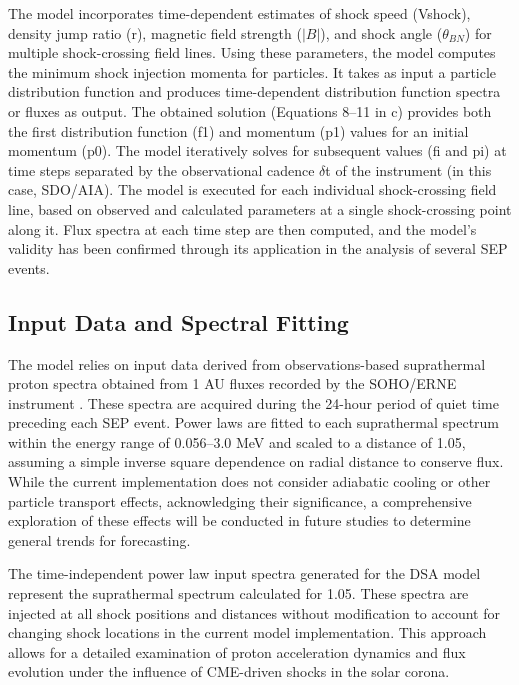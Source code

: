 The model incorporates time-dependent estimates of shock speed (Vshock), density jump ratio (r), magnetic field strength ($|B|$), and shock angle ($\theta_{BN}$) for multiple shock-crossing field lines. Using these parameters, the model computes the minimum shock injection momenta for particles. It takes as input a particle distribution function and produces time-dependent distribution function spectra or fluxes as output. The obtained solution (Equations 8–11 in c\citet{kozarev_2016}) provides both the first distribution function (f1) and momentum (p1) values for an initial momentum (p0). The model iteratively solves for subsequent values (fi and pi) at time steps separated by the observational cadence $\delta$t of the instrument (in this case, SDO/AIA). The model is executed for each individual shock-crossing field line, based on observed and calculated parameters at a single shock-crossing point along it. Flux spectra at each time step are then computed, and the model's validity has been confirmed through its application in the analysis of several SEP events.

\subsection{Input Data and Spectral Fitting}
The model relies on input data derived from observations-based suprathermal proton spectra obtained from 1 AU fluxes recorded by the SOHO/ERNE instrument \citep{torsti_1995}. These spectra are acquired during the 24-hour period of quiet time preceding each SEP event. Power laws are fitted to each suprathermal spectrum within the energy range of 0.056–3.0 MeV and scaled to a distance of 1.05\rsun, assuming a simple inverse square dependence on radial distance to conserve flux. While the current implementation does not consider adiabatic cooling or other particle transport effects, acknowledging their significance, a comprehensive exploration of these effects will be conducted in future studies to determine general trends for forecasting.

The time-independent power law input spectra generated for the DSA model represent the suprathermal spectrum calculated for 1.05\rsun. These spectra are injected at all shock positions and distances without modification to account for changing shock locations in the current model implementation. This approach allows for a detailed examination of proton acceleration dynamics and flux evolution under the influence of CME-driven shocks in the solar corona.

